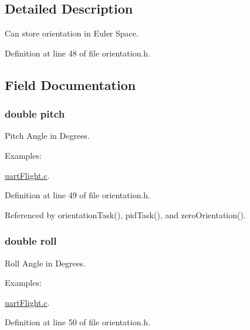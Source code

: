 \subsection{Detailed Description}
Can store orientation in Euler Space. 

Definition at line 48 of file orientation.\-h.



\subsection{Field Documentation}
\hypertarget{struct_angles_a34c057a0378030db67bd6a129f37d938}{
\subsubsection[{pitch}]{\setlength{\rightskip}{0pt plus 5cm}double pitch}}\label{struct_angles_a34c057a0378030db67bd6a129f37d938}


Pitch Angle in Degrees. 

\begin{Desc}
\item[Examples\-: ]\par
\hyperlink{uart_flight_8c-example}{uart\-Flight.\-c}.\end{Desc}


Definition at line 49 of file orientation.\-h.



Referenced by orientation\-Task(), pid\-Task(), and zero\-Orientation().

\hypertarget{struct_angles_a1d3228afa3a1d6773954f40c1e519eb9}{
\subsubsection[{roll}]{\setlength{\rightskip}{0pt plus 5cm}double roll}}\label{struct_angles_a1d3228afa3a1d6773954f40c1e519eb9}


Roll Angle in Degrees. 

\begin{Desc}
\item[Examples\-: ]\par
\hyperlink{uart_flight_8c-example}{uart\-Flight.\-c}.\end{Desc}


Definition at line 50 of file orientation.\-h.



